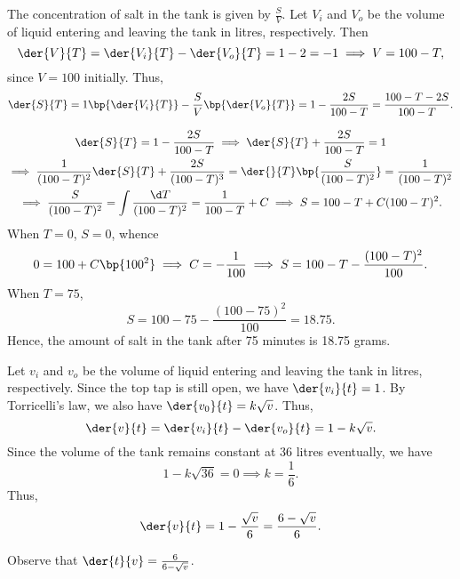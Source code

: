 \begin{solution}
    \begin{ppart}
        The concentration of salt in the tank is given by $\frac{S}{V}$. Let $V_i$ and $V_o$ be the volume of liquid entering and leaving the tank in litres, respectively. Then \[\der{V}{T} = \der{V_i}{T} - \der{V_o}{T} = 1 - 2 = -1 \implies V = 100 - T,\] since $V = 100$ initially. Thus, \[\der{S}{T} = 1 \bp{\der{V_i}{T}} - \frac{S}{V} \bp{\der{V_o}{T}} = 1 - \frac{2S}{100 - T} = \frac{100 - T - 2S}{100 - T}.\]
    \end{ppart}
    \begin{ppart}
        \begin{gather*}
            \der{S}{T} = 1 - \frac{2S}{100-T} \implies \der{S}{T} + \frac{2S}{100-T} = 1 \\
            \implies \frac1{(100-T)^2} \der{S}{T} + \frac{2S}{(100-T)^3} = \der{}{T} \bp{\frac{S}{(100-T)^2}} = \frac1{(100-T)^2}\\
            \implies \frac{S}{(100-T)^2} = \int \frac{\d T}{(100-T)^2} = \frac1{100-T} + C \implies S = 100 - T + C(100-T)^2.
        \end{gather*}
        When $T = 0$, $S = 0$, whence \[0 = 100 + C \bp{100^2} \implies C = -\frac1{100} \implies S = 100 - T - \frac{(100-T)^2}{100}.\] When $T = 75$, \[S = 100 - 75 - \frac{(100-75)^2}{100} = 18.75.\] Hence, the amount of salt in the tank after 75 minutes is 18.75 grams.
    \end{ppart}
    \begin{ppart}
        Let $v_i$ and $v_o$ be the volume of liquid entering and leaving the tank in litres, respectively. Since the top tap is still open, we have $\der{v_i}{t} = 1$. By Torricelli's law, we also have $\der{v_0}{t} = k\sqrt{v}$. Thus, \[\der{v}{t} =  \der{v_i}{t} - \der{v_o}{t} = 1 - k\sqrt{v}.\] Since the volume of the tank remains constant at 36 litres eventually, we have \[1 - k\sqrt{36} = 0 \implies k = \frac16.\] Thus, \[\der{v}{t} = 1 - \frac{\sqrt{v}}6 = \frac{6-\sqrt{v}}{6}.\]

        Observe that $\der{t}{v} = \frac{6}{6 - \sqrt v}$.


\end{ppart}
\end{solution}
